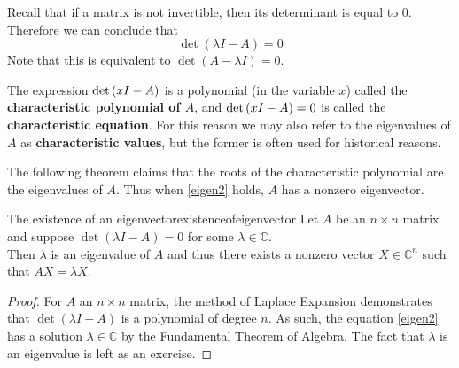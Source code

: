 Recall that if a matrix
is not invertible, then its determinant is equal to $0$.  Therefore we
can conclude that
\begin{equation}
\det \left( \lambda I - A\right) =0  \label{eigen2}
\end{equation}
Note that this is equivalent to $\det \left(A- \lambda I \right) =0$. 

The expression $\det \left( x I-A\right) $ is a polynomial (in
the variable $x$) called the
\textbf{characteristic polynomial of $A$}, and 
$\det \left( x I-A\right) =0$ is called the \textbf{characteristic
equation}. For this reason we may also refer to
the eigenvalues of $A$ as \textbf{characteristic values}, but the
former is often used for historical reasons.

The following theorem claims that the roots of the characteristic
polynomial are the eigenvalues of $A$.  Thus when \ref{eigen2}
holds, $A$ has a nonzero eigenvector.

\begin{theorem}{The existence of an eigenvector}{existenceofeigenvector}
Let $A$ be an $n\times n$ matrix and suppose $\det \left( \lambda I -
A\right) =0$ for some $ \lambda \in \mathbb{C}$.  \\
Then $\lambda$ is an eigenvalue of $A$ and thus there exists a nonzero
vector $X \in \mathbb{C}^{n}$ such that $AX=\lambda X$. 
\end{theorem}

\begin{proof}
For $A$ an $n\times n$ matrix, the method of Laplace
Expansion demonstrates that $\det \left( \lambda I - A \right) $ is a
polynomial of degree $n.$ As such, the equation
\ref{eigen2} has a solution $\lambda \in \mathbb{C}$ by the Fundamental
Theorem of Algebra. The fact that $\lambda$ is an eigenvalue is left as an exercise. 
\end{proof}
